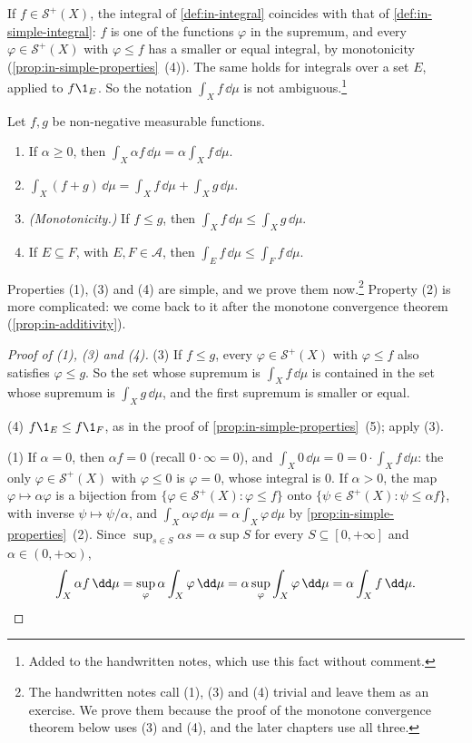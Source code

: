\begin{remark}[Consistency]\label{rem:in-consistent}
If $f\in\mathcal S^+(X)$, the integral of \cref{def:in-integral} coincides with that of
\cref{def:in-simple-integral}: $f$ is one of the functions $\varphi$ in the supremum, and every
$\varphi\in\mathcal S^+(X)$ with $\varphi\le f$ has a smaller or equal integral, by monotonicity
(\cref{prop:in-simple-properties}~(4)). The same holds for integrals over a set $E$, applied to
$f\1_E$. So the notation $\int_Xf\,\dd\mu$ is not ambiguous.\footnote{Added to the handwritten
notes, which use this fact without comment.}
\end{remark}

\begin{proposition}[Properties]\label{prop:in-properties}
Let $f,g$ be non-negative measurable functions.
\begin{enumerate}[label=(\arabic*)]
  \item If $\alpha\ge0$, then $\int_X\alpha f\,\dd\mu=\alpha\int_Xf\,\dd\mu$.
  \item $\int_X(f+g)\,\dd\mu=\int_Xf\,\dd\mu+\int_Xg\,\dd\mu$.
  \item \emph{(Monotonicity.)} If $f\le g$, then $\int_Xf\,\dd\mu\le\int_Xg\,\dd\mu$.
  \item If $E\subseteq F$, with $E,F\in\mathcal A$, then $\int_Ef\,\dd\mu\le\int_Ff\,\dd\mu$.
\end{enumerate}
\end{proposition}

Properties (1), (3) and (4) are simple, and we prove them now.\footnote{The handwritten notes
call (1), (3) and (4) trivial and leave them as an exercise. We prove them because the proof of
the monotone convergence theorem below uses (3) and (4), and the later chapters use all
three.} Property (2) is more complicated: we come back to it after the monotone convergence
theorem (\cref{prop:in-additivity}).

\begin{proof}[Proof of (1), (3) and (4)]
(3) If $f\le g$, every $\varphi\in\mathcal S^+(X)$ with $\varphi\le f$ also satisfies
$\varphi\le g$. So the set whose supremum is $\int_Xf\,\dd\mu$ is contained in the set whose
supremum is $\int_Xg\,\dd\mu$, and the first supremum is smaller or equal.

(4) $f\1_E\le f\1_F$, as in the proof of \cref{prop:in-simple-properties}~(5); apply (3).

(1) If $\alpha=0$, then $\alpha f=0$ (recall $0\cdot\infty=0$), and $\int_X0\,\dd\mu=0=0\cdot\int_Xf\,\dd\mu$:
the only $\varphi\in\mathcal S^+(X)$ with $\varphi\le0$ is $\varphi=0$, whose integral is $0$. If
$\alpha>0$, the map $\varphi\mapsto\alpha\varphi$ is a bijection from
$\{\varphi\in\mathcal S^+(X):\varphi\le f\}$ onto $\{\psi\in\mathcal S^+(X):\psi\le\alpha f\}$, with
inverse $\psi\mapsto\psi/\alpha$, and $\int_X\alpha\varphi\,\dd\mu=\alpha\int_X\varphi\,\dd\mu$ by
\cref{prop:in-simple-properties}~(2). Since $\sup_{s\in S}\alpha s=\alpha\sup S$ for every
$S\subseteq[0,+\infty]$ and $\alpha\in(0,+\infty)$,
\[
  \int_X\alpha f\,\dd\mu=\sup_{\varphi}\alpha\int_X\varphi\,\dd\mu=\alpha\sup_\varphi\int_X\varphi\,\dd\mu
  =\alpha\int_Xf\,\dd\mu .\qedhere
\]
\end{proof}

